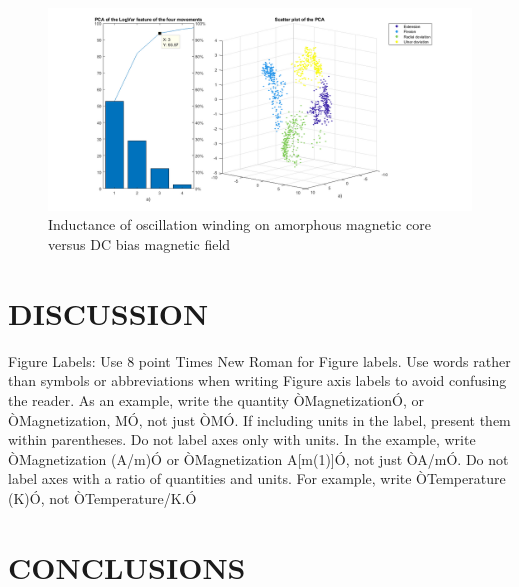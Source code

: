 \documentclass[a4paper, 10pt, conference]{ieeeconf}      %
\begin{document}
\begin{figure}[thpb]
	\centering
	\includegraphics[scale=.27]{Figures/pcasubplotLogVar}
	\caption{Inductance of oscillation winding on amorphous
		magnetic core versus DC bias magnetic field}
	\label{PCA_logvar}
\end{figure}
	\section{DISCUSSION}
	
	
	
	


	
	
	Figure Labels: Use 8 point Times New Roman for Figure labels. Use words rather than symbols or abbreviations when writing Figure axis labels to avoid confusing the reader. As an example, write the quantity ÒMagnetizationÓ, or ÒMagnetization, MÓ, not just ÒMÓ. If including units in the label, present them within parentheses. Do not label axes only with units. In the example, write ÒMagnetization (A/m)Ó or ÒMagnetization {A[m(1)]}Ó, not just ÒA/mÓ. Do not label axes with a ratio of quantities and units. For example, write ÒTemperature (K)Ó, not ÒTemperature/K.Ó
	
	\section{CONCLUSIONS}
	
\end{document}
